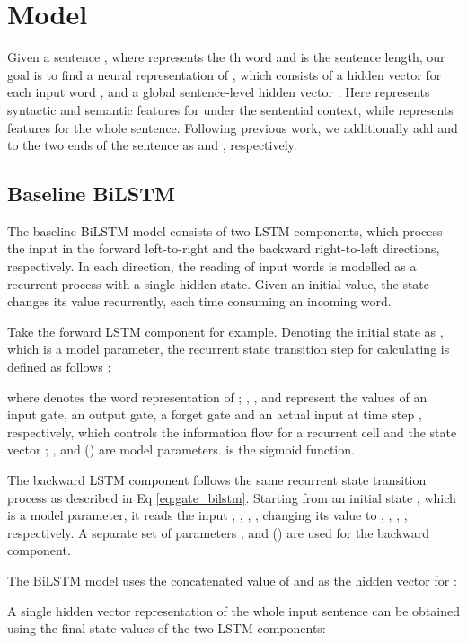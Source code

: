 \documentclass[11pt,a4paper]{article}
\begin{document}
\section{Model}
Given a sentence , where  represents the th word and  is the sentence length, our goal is to find a neural representation of , which consists of a hidden vector  for each input word , and a global sentence-level hidden vector . 
Here  represents syntactic and semantic features for  under the sentential context, while  represents features for the whole sentence. 
Following previous work, we additionally add  and  to the two ends of the sentence as  and , respectively.





\subsection{Baseline BiLSTM}
\label{sec:bilstm}




The baseline BiLSTM model consists of two LSTM components, which process the input in the forward left-to-right and the backward right-to-left directions, respectively. 
In each direction, the reading of input words is modelled as a recurrent process with a single hidden state. 
Given an initial value, the state changes its value recurrently, each time consuming an incoming word.


Take the forward LSTM component for example. Denoting the initial state as , which is a model parameter, the recurrent state transition step for calculating  is defined as follows \cite{graves2005framewise}:

where  denotes the word representation of ; , ,  and  represent the values of an input gate, an output gate, a forget gate and an actual input at time step , respectively, which controls the information flow for a recurrent cell  and the state vector ; ,  and  () are model parameters.
 is the sigmoid function.


The backward LSTM component follows the same recurrent state transition process as described in Eq \ref{eq:gate_bilstm}. 
Starting from an initial state , which is a model parameter, it reads the input , , , , changing its value to , , , , respectively. 
A separate set of parameters ,  and  () are used for the backward component.


The BiLSTM model uses the concatenated value of  and  as the hidden vector for :

A single hidden vector representation  of the whole input sentence can be obtained using the final state values of the two LSTM components:
\end{document}
